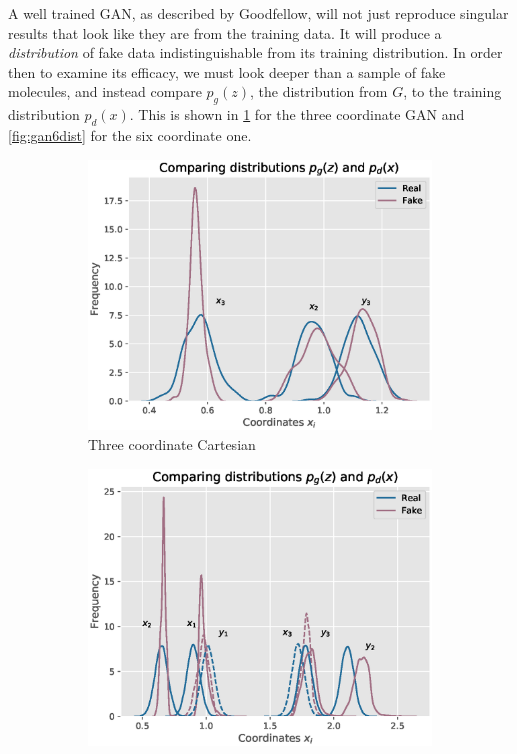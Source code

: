 \documentclass[12pt,a4paper]{article}
\begin{document}
\clearpage
A well trained GAN, as described by Goodfellow\cite{goodfellow_generative_2014}, will not just reproduce singular results that look like they are from the training data. It will produce a \emph{distribution} of fake data indistinguishable from its training distribution. In order then to examine its efficacy, we must look deeper than a sample of fake molecules, and instead compare $p_g(z)$, the distribution from $G$, to the training distribution $p_d(x)$. This is shown in \ref{fig:gan3dist} for the three coordinate GAN and \ref{fig:gan6dist} for the six coordinate one.
\begin{figure}[h!]
    \centering
    \begin{subfigure}[h]{0.50\textwidth}
        \includegraphics[width = \linewidth]{images/gan3distrib.eps}
        \caption{Three coordinate Cartesian}
        \label{fig:gan3dist}    
    \end{subfigure}
    \hspace{-0.28cm}
    \begin{subfigure}[h]{0.50\textwidth}
        \includegraphics[width = \linewidth]{images/gan6distrib.eps}

\end{subfigure}
\end{figure}
\end{document}
